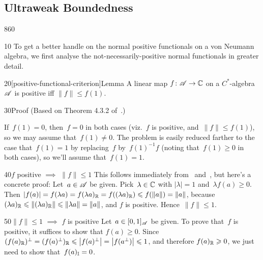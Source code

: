 \subsection{Ultraweak Boundedness}
\begin{parsec}{860}%
\begin{point}{10}%
To get a better handle on the normal positive functionals
on a von Neumann algebra,
we first analyse  the not-necessarily-positive normal functionals
in greater detail.
\end{point}
\begin{point}{20}[positive-functional-criterion]{Lemma}%
A linear map $f\colon \mathscr{A}\to \mathbb{C}$
on a $C^*$-algebra~$\mathscr{A}$
is positive iff $\|f\|\leq f(1)$.
\begin{point}{30}{Proof}%
(Based on Theorem 4.3.2 of~\cite{kr}.)

If~$f(1)=0$, then~$f=0$ in both cases 
(viz.~$f$ is positive, and~$\|f\|\leq f(1)$),
so
we may assume that~$f(1)\neq 0$.
The problem is easily reduced farther to the case 
that~$f(1)=1$
by replacing~$f$ by~$f(1)^{-1}f$
(noting that~$f(1)\geq 0$ in both cases),
so we'll assume that~$f(1)=1$.
\begin{point}{40}{$f$ positive $\implies$ $\|f\|\leq 1$}%
This follows
immediately from~ and~,
but here's a concrete proof:
Let~$a\in \mathscr{A}$ be given.
Pick~$\lambda\in \mathbb{C}$ with $\left|\lambda\right|=1$
and~$\lambda f(a)\geq 0$.
Then $\left|f(a)\right|=f(\lambda a) 
= f(\lambda a)_{\mathbb{R}}
= f((\lambda a)_{\mathbb{R}})
\leqslant f(\|a\|)=\|a\|$,
because $(\lambda a)_{\mathbb{R}}
\leqslant \|(\lambda a)_{\mathbb{R}}\|
\leqslant \|\lambda a\|=\|a\|$,
and $f$ is positive.
Hence~$\|f\|\leq 1$.
\end{point}
\begin{point}{50}{$\|f\|\leq 1$ $\implies$ $f$ is positive}%
Let~$a\in [0,1]_{\mathscr{A}}$ be given.
To prove that~$f$ is positive, it suffices to show that $f(a)\geq 0$.
Since $(f(a)_{\mathbb{R}})^\perp
=(f(a)^\perp)_{\mathbb{R}}
\leqslant \left|f(a)^\perp \right|
=\left|f(a^\perp)\right|\leqslant 1$,
and therefore $f(a)_{\mathbb{R}}\geqslant 0$,
we just need to show that~$f(a)_{\mathbb{I}}=0$.


\end{point}
\end{point}
\end{point}
\end{parsec}

